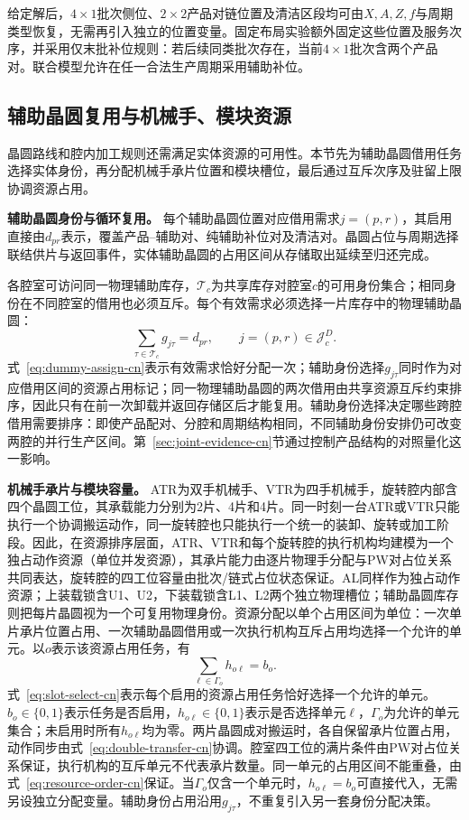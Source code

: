 \documentclass[final,5p,times,twocolumn]{elsarticle}
\begin{document}
给定解后，$4\times1$批次侧位、$2\times2$产品对链位置及清洁区段均可由$X,A,Z,f$与周期类型恢复，无需再引入独立的位置变量。固定布局实验额外固定这些位置及服务次序，并采用仅末批补位规则：若后续同类批次存在，当前$4\times1$批次含两个产品对。联合模型允许在任一合法生产周期采用辅助补位。

\subsection{辅助晶圆复用与机械手、模块资源}
\label{sec:model-resource-cn}

晶圆路线和腔内加工规则还需满足实体资源的可用性。本节先为辅助晶圆借用任务选择实体身份，再分配机械手承片位置和模块槽位，最后通过互斥次序及驻留上限协调资源占用。

\noindent\textbf{辅助晶圆身份与循环复用。}
每个辅助晶圆位置对应借用需求$j=(p,r)$，其启用直接由$d_{pr}$表示，覆盖产品--辅助对、纯辅助补位对及清洁对。晶圆占位与周期选择联结供片与返回事件，实体辅助晶圆的占用区间从存储取出延续至归还完成。

各腔室可访问同一物理辅助库存，$\mathcal T_c$为共享库存对腔室$c$的可用身份集合；相同身份在不同腔室的借用也必须互斥。每个有效需求必须选择一片库存中的物理辅助晶圆：
\begin{equation}
\sum_{\tau\in\mathcal T_c}g_{j\tau}=d_{pr},
\qquad j=(p,r)\in\mathcal J_c^D.
\label{eq:dummy-assign-cn}
\end{equation}
式~\eqref{eq:dummy-assign-cn}表示有效需求恰好分配一次；辅助身份选择$g_{j\tau}$同时作为对应借用区间的资源占用标记；同一物理辅助晶圆的两次借用由共享资源互斥约束排序，因此只有在前一次卸载并返回存储区后才能复用。辅助身份选择决定哪些跨腔借用需要排序：即使产品配对、分腔和周期结构相同，不同辅助身份安排仍可改变两腔的并行生产区间。第~\ref{sec:joint-evidence-cn}节通过控制产品结构的对照量化这一影响。

\noindent\textbf{机械手承片与模块容量。}
ATR为双手机械手、VTR为四手机械手，旋转腔内部含四个晶圆工位，其承载能力分别为2片、4片和4片。同一时刻一台ATR或VTR只能执行一个协调搬运动作，同一旋转腔也只能执行一个统一的装卸、旋转或加工阶段。因此，在资源排序层面，ATR、VTR和每个旋转腔的执行机构均建模为一个独占动作资源（单位并发资源），其承片能力由逐片物理手分配与PW对占位关系共同表达，旋转腔的四工位容量由批次/链式占位状态保证。AL同样作为独占动作资源；上装载锁含U1、U2，下装载锁含L1、L2两个独立物理槽位；辅助晶圆库存则把每片晶圆视为一个可复用物理身份。资源分配以单个占用区间为单位：一次单片承片位置占用、一次辅助晶圆借用或一次执行机构互斥占用均选择一个允许的单元。以$o$表示该资源占用任务，有
\begin{equation}
\sum_{\ell\in\Gamma_o}h_{o\ell}=b_o.
\label{eq:slot-select-cn}
\end{equation}
式~\eqref{eq:slot-select-cn}表示每个启用的资源占用任务恰好选择一个允许的单元。$b_o\in\{0,1\}$表示任务是否启用，$h_{o\ell}\in\{0,1\}$表示是否选择单元$\ell$，$\Gamma_o$为允许的单元集合；未启用时所有$h_{o\ell}$均为零。两片晶圆成对搬运时，各自保留承片位置占用，动作同步由式~\eqref{eq:double-transfer-cn}协调。腔室四工位的满片条件由PW对占位关系保证，执行机构的互斥单元不代表承片数量。同一单元的占用区间不能重叠，由式~\eqref{eq:resource-order-cn}保证。当$\Gamma_o$仅含一个单元时，$h_{o\ell}=b_o$可直接代入，无需另设独立分配变量。辅助身份占用沿用$g_{j\tau}$，不重复引入另一套身份分配决策。
\end{document}
